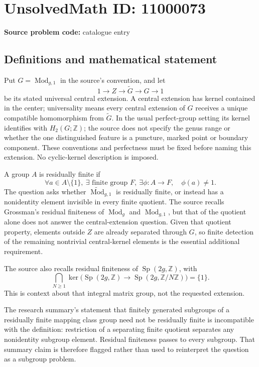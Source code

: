 \documentclass[11pt]{article}
\newcommand{\Z}{\mathbb{Z}}
\begin{document}
\section*{UnsolvedMath ID: 11000073}
\textbf{Source problem code:} catalogue entry
\subsection{Definitions and mathematical statement}
Put \(G=\operatorname{Mod}_{g,1}\) in the source's convention, and let
\[1\longrightarrow Z\longrightarrow\widetilde G\longrightarrow G\longrightarrow1\]
be its stated universal central extension. A central extension has kernel contained in the center; universality means every central extension of \(G\) receives a unique compatible homomorphism from \(\widetilde G\). In the usual perfect-group setting its kernel identifies with \(H_2(G;\Z)\); the source does not specify the genus range or whether the one distinguished feature is a puncture, marked point or boundary component. These conventions and perfectness must be fixed before naming this extension. No cyclic-kernel description is imposed.

A group \(A\) is residually finite if
\[\forall a\in A\setminus\{1\},\ \exists\text{ finite group }F,\ \exists\phi:A\to F,\quad\phi(a)\ne1.\]
The question asks whether \(\widetilde{\operatorname{Mod}}_{g,1}\) is residually finite, or instead has a nonidentity element invisible in every finite quotient. The source recalls Grossman's residual finiteness of \(\operatorname{Mod}_g\) and \(\operatorname{Mod}_{g,1}\), but that of the quotient alone does not answer the central-extension question. Given that quotient property, elements outside \(Z\) are already separated through \(G\), so finite detection of the remaining nontrivial central-kernel elements is the essential additional requirement.

The source also recalls residual finiteness of \(\operatorname{Sp}(2g,\Z)\), with
\[\bigcap_{N\geq1}\ker\bigl(\operatorname{Sp}(2g,\Z)\to\operatorname{Sp}(2g,\Z/N\Z)\bigr)=\{1\}.\]
This is context about that integral matrix group, not the requested extension.

The research summary's statement that finitely generated subgroups of a residually finite mapping class group need not be residually finite is incompatible with the definition: restriction of a separating finite quotient separates any nonidentity subgroup element. Residual finiteness passes to every subgroup. That summary claim is therefore flagged rather than used to reinterpret the question as a subgroup problem.
\end{document}
